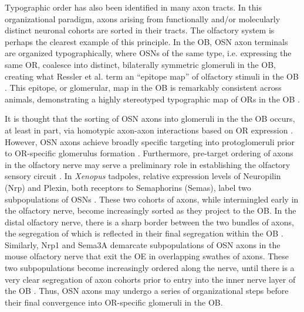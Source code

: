 \label{sec:Typography}
Typographic order has also been identified in many axon tracts.
In this organizational paradigm, axons arising from functionally and/or molecularly distinct neuronal cohorts are sorted in their tracts.
The olfactory system is perhaps the clearest example of this principle. 
In the OB, OSN axon terminals are organized typographically, where OSNs of the same type, i.e. expressing the same OR, coalesce into distinct, bilaterally symmetric glomeruli in the OB, creating what Ressler et al. term an ``epitope map'' of olfactory stimuli in the OB \cite{ressler1994information,vassar1994topographic}.
This epitope, or glomerular, map in the OB is remarkably consistent across animals, demonstrating a highly stereotyped typographic map of ORs in the OB \cite{ressler1994information,vassar1994topographic}.

It is thought that the sorting of OSN axons into glomeruli in the the OB occurs, at least in part, via homotypic axon-axon interactions based on OR expression \cite{feinstein2004contextual}.
However, OSN axons achieve broadly specific targeting into protoglomeruli prior to OR-specific glomerulus formation \cite{taku2016attractant}.
Furthermore, pre-target ordering of axons in the olfactory nerve may serve a preliminary role in establishing the olfactory sensory circuit \cite{miller2010axon}.
In \emph{Xenopus} tadpoles, relative expression levels of Neuropilin (Nrp) and Plexin, both receptors to Semaphorins (Semas), label two subpopulations of OSNs \cite{satoda1995differential}.
These two cohorts of axons, while intermingled early in the olfactory nerve, become increasingly sorted as they project to the OB.
In the distal olfactory nerve, there is a sharp border between the two bundles of axons, the segregation of which is reflected in their final segregation within the OB \cite{satoda1995differential}.
Similarly, Nrp1 and Sema3A demarcate subpopulations of OSN axons in the mouse olfactory nerve that exit the OE in overlapping swathes of axons.
These two subpopulations become increasingly ordered along the nerve, until there is a very clear segregation of axon cohorts prior to entry into the inner nerve layer of the OB \cite{imai2009pre,miller2010axon}.
Thus, OSN axons may undergo a series of organizational steps before their final convergence into OR-specific glomeruli in the OB.

